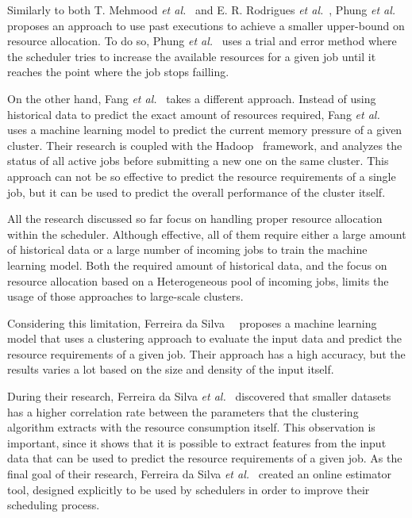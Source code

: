Similarly to both T. Mehmood \emph{et al.}~\cite{mehmood2018} and E. R. Rodrigues \emph{et al.}~\cite{rodrigues2016}, Phung \emph{et al.}~\cite{phung2021} proposes an approach to use past executions to achieve a smaller upper-bound on resource allocation.
To do so, Phung \emph{et al.}~\cite{phung2021} uses a trial and error method where the scheduler tries to increase the available resources for a given job until it reaches the point where the job stops failling.

On the other hand, Fang \emph{et al.}~\cite{fang2018} takes a different approach.
Instead of using historical data to predict the exact amount of resources required, Fang \emph{et al.}~\cite{fang2018} uses a machine learning model to predict the current memory pressure of a given cluster.
Their research is coupled with the Hadoop~\cite{hadoop} framework, and analyzes the status of all active jobs before submitting a new one on the same cluster.
This approach can not be so effective to predict the resource requirements of a single job, but it can be used to predict the overall performance of the cluster itself.

All the research discussed so far focus on handling proper resource allocation within the scheduler.
Although effective, all of them require either a large amount of historical data or a large number of incoming jobs to train the machine learning model.
Both the required amount of historical data, and the focus on resource allocation based on a Heterogeneous pool of incoming jobs, limits the usage of those approaches to large-scale clusters.

Considering this limitation, Ferreira da Silva~\etal~\cite{ferreira2013} proposes a machine learning model that uses a clustering approach to evaluate the input data and predict the resource requirements of a given job.
Their approach has a high accuracy, but the results varies a lot based on the size and density of the input itself.

During their research, Ferreira da Silva \emph{et al.}~\cite{ferreira2013} discovered that smaller datasets has a higher correlation rate between the parameters that the clustering algorithm extracts with the resource consumption itself.
This observation is important, since it shows that it is possible to extract features from the input data that can be used to predict the resource requirements of a given job.
As the final goal of their research, Ferreira da Silva \emph{et al.}~\cite{ferreira2013} created an online estimator tool, designed explicitly to be used by schedulers in order to improve their scheduling process.

